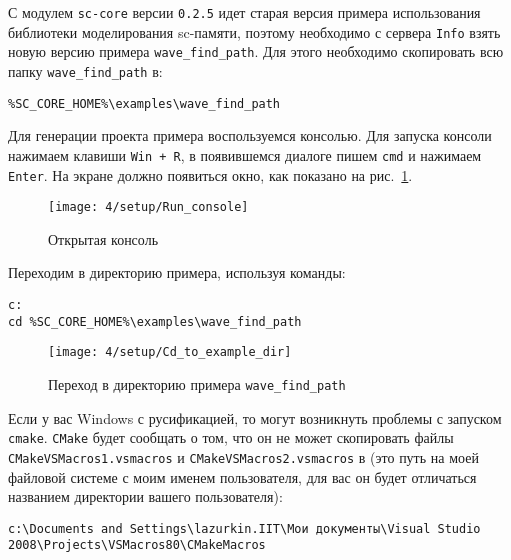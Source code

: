 С модулем \texttt{sc-core} версии \texttt{0.2.5} идет старая версия
примера использования библиотеки моделирования sc-памяти, поэтому
необходимо с сервера \texttt{Info} взять новую версию примера
\verb|wave_find_path|. Для этого необходимо скопировать всю папку \verb|wave_find_path| в:

\begin{framed}
\begin{verbatim}
%SC_CORE_HOME%\examples\wave_find_path
\end{verbatim}
\end{framed}

Для генерации проекта примера воспользуемся консолью. Для запуска
консоли нажимаем клавиши \verb|Win + R|, в появившемся диалоге пишем
\verb|cmd| и нажимаем \texttt{Enter}. На экране должно появиться окно,
как показано на рис.~\ref{fig:Run_console}.

\begin{figure}[h!]
  \centering
  \texttt{[image: 4/setup/Run\_console]}
  \caption{Открытая консоль}
  \label{fig:Run_console}
\end{figure}

Переходим в директорию примера, используя команды:

\begin{framed}
\begin{verbatim}
c: 
cd %SC_CORE_HOME%\examples\wave_find_path
\end{verbatim}
\end{framed}

\begin{figure}[h]
 \centering
 \texttt{[image: 4/setup/Cd\_to\_example\_dir]}
 \caption{Переход в директорию примера \texttt{wave\_find\_path}}
  \label{fig:cd_to_example_dir}
\end{figure}

Если у вас Windows с русификацией, то могут возникнуть проблемы с
запуском \texttt{cmake}. \texttt{CMake} будет сообщать о том, что он
не может скопировать файлы \verb|CMakeVSMacros1.vsmacros| и
\verb|CMakeVSMacros2.vsmacros| в (это путь на моей файловой системе с
моим именем пользователя, для вас он будет отличаться названием
директории вашего пользователя):

{\scriptsize
\begin{framed}
\begin{verbatim}
c:\Documents and Settings\lazurkin.IIT\Мои документы\Visual Studio 2008\Projects\VSMacros80\CMakeMacros
\end{verbatim}
\end{framed}
}


